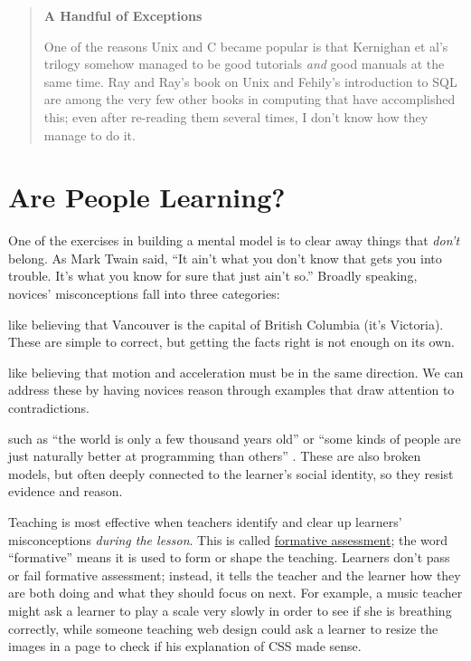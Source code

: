 \begin{quote}\setlength{\parindent}{0pt}
\textbf{A Handful of Exceptions}

One of the reasons Unix and C became popular is that Kernighan et
al's trilogy \cite{Kern1978,Kern1983,Kern1988}
somehow managed to be good tutorials \emph{and} good manuals at the same
time. Ray and Ray's book on Unix \cite{Ray2014} and Fehily's
introduction to SQL \cite{Fehi2008} are among the very few other
books in computing that have accomplished this; even after
re-reading them several times, I don't know how they manage to do
it.
\end{quote}

\section{Are People Learning?}\label{s:models-formative-assessment}

One of the exercises in building a mental model is to clear away things
that \emph{don't} belong. As Mark Twain said, ``It ain't what you don't know
that gets you into trouble. It's what you know for sure that just ain't
so.'' Broadly speaking, novices' misconceptions fall into three
categories:

\begin{description}
\tightlist
\item[Factual errors]
like believing that Vancouver is the capital of British Columbia
(it's Victoria). These are simple to correct, but getting the
facts right is not enough on its own.
\item[Broken models]
like believing that motion and acceleration must be in the same
direction. We can address these by having novices reason through
examples that draw attention to contradictions.
\item[Fundamental beliefs]
such as ``the world is only a few thousand years old'' or ``some kinds
of people are just naturally better at programming than others''
\cite{Guzd2015b,Pati2016}. These are also broken models, but
often deeply connected to the learner's social identity, so they
resist evidence and reason.
\end{description}

Teaching is most effective when teachers identify and clear up learners'
misconceptions \emph{during the lesson}. This is called
\protect\hyperlink{g:formative-assessment}{formative assessment}; the word
``formative'' means it is used to form or shape the teaching. Learners
don't pass or fail formative assessment; instead, it tells the teacher
and the learner how they are both doing and what they should focus on
next. For example, a music teacher might ask a learner to play a scale
very slowly in order to see if she is breathing correctly, while someone
teaching web design could ask a learner to resize the images in a page
to check if his explanation of CSS made sense.

